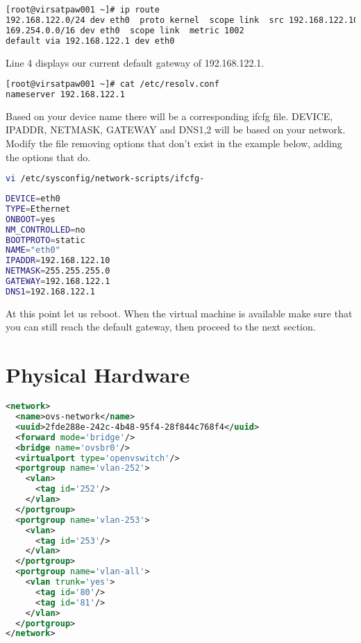 \documentclass[11pt,letterpaper,oneside]{book}
\begin{document}
\begin{lstlisting}[caption={Current Default Route},language=bash]
[root@virsatpaw001 ~]# ip route
192.168.122.0/24 dev eth0  proto kernel  scope link  src 192.168.122.10
169.254.0.0/16 dev eth0  scope link  metric 1002 
default via 192.168.122.1 dev eth0 
\end{lstlisting}
Line 4 displays our current default gateway of 192.168.122.1.

\begin{lstlisting}[caption={Current Resolver},language=bash]
[root@virsatpaw001 ~]# cat /etc/resolv.conf
nameserver 192.168.122.1
\end{lstlisting}


Based on your device name there will be a corresponding ifcfg file.  DEVICE, IPADDR, NETMASK, GATEWAY and DNS1,2 will be based on your network.  Modify the file removing options that don't exist in the example below, adding the options that do.
\begin{lstlisting}[caption={Modify Ethernet interface from DHCP to static},language=bash]
vi /etc/sysconfig/network-scripts/ifcfg-
\end{lstlisting}

\begin{lstlisting}[caption={Example Ethernet configuration},language=bash]
DEVICE=eth0
TYPE=Ethernet
ONBOOT=yes
NM_CONTROLLED=no
BOOTPROTO=static
NAME="eth0"
IPADDR=192.168.122.10
NETMASK=255.255.255.0
GATEWAY=192.168.122.1
DNS1=192.168.122.1
\end{lstlisting}
At this point let us reboot.  When the virtual machine is available make sure that you can still reach the default gateway, then proceed to the next section.

\chapter{Physical Hardware}
\begin{lstlisting}[caption={Open vSwitch},language=xml]
<network>
  <name>ovs-network</name>
  <uuid>2fde288e-242c-4b48-95f4-28f844c768f4</uuid>
  <forward mode='bridge'/>
  <bridge name='ovsbr0'/>
  <virtualport type='openvswitch'/>
  <portgroup name='vlan-252'>
    <vlan>
      <tag id='252'/>
    </vlan>
  </portgroup>
  <portgroup name='vlan-253'>
    <vlan>
      <tag id='253'/>
    </vlan>
  </portgroup>
  <portgroup name='vlan-all'>
    <vlan trunk='yes'>
      <tag id='80'/>
      <tag id='81'/>
    </vlan>
  </portgroup>
</network>
\end{lstlisting}
\end{document}
